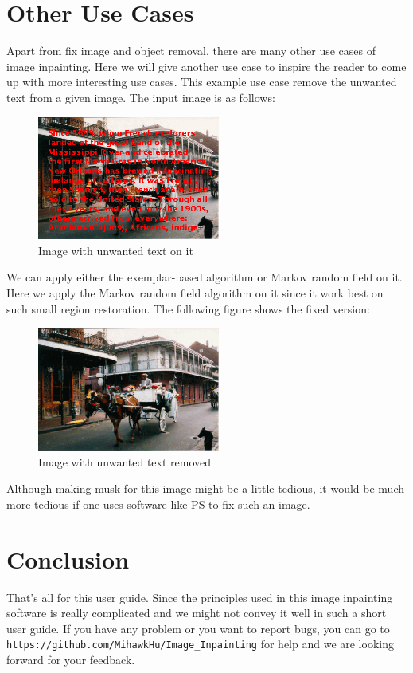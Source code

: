 \section{Other Use Cases}
Apart from fix image and object removal, there are many other use cases of image inpainting. Here we will give another use case to inspire the reader to come up with more interesting use cases. This example use case remove the unwanted text from a given image. The input image is as follows:
\begin{figure}[H]
\centering
\includegraphics[width=6cm]{hc.png}
\caption{Image with unwanted text on it}
\end{figure}
We can apply either the exemplar-based algorithm or Markov random field on it. Here we apply the Markov random field algorithm on it since it work best on such small region restoration. The following figure shows the fixed version:
\begin{figure}[H]
\centering
\includegraphics[width=6cm]{hc_res.png}
\caption{Image with unwanted text removed}
\end{figure}
Although making musk for this image might be a little tedious, it would be much more tedious if one uses software like PS to fix such an image.


\newpage
\section{Conclusion}
That's all for this user guide. Since the principles used in this image inpainting software is really complicated and we might not convey it well in such a short user guide. If you have any problem or you want to report bugs, you can go to \texttt{https://github.com/MihawkHu/Image\_Inpainting} for help and we are looking forward for your feedback.